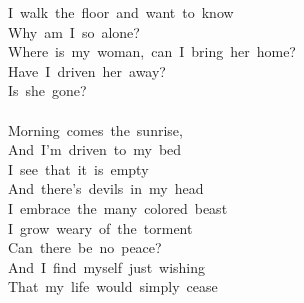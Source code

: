 {I\ walk\ the\ floor\ and\ want\ to\ know\\
Why\ am\ I\ so\ alone?\\
Where\ is\ my\ woman,\ can\ I\ bring\ her\ home?\\
Have\ I\ driven\ her\ away?\\
Is\ she\ gone?\\
\\
Morning\ comes\ the\ sunrise,\\
And\ I'm\ driven\ to\ my\ bed\\
I\ see\ that\ it\ is\ empty\\
And\ there's\ devils\ in\ my\ head\\
I\ embrace\ the\ many\ colored\ beast\\
I\ grow\ weary\ of\ the\ torment\\
Can\ there\ be\ no\ peace?\\
And\ I\ find\ myself\ just\ wishing\\
That\ my\ life\ would\ simply\ cease}
